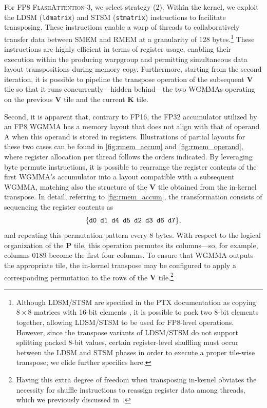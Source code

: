 \begin{algorithm}[H]
\begin{algorithmic}[1]
For FP8 \textsc{FlashAttention-3}, we select strategy (2). Within the kernel, we exploit the LDSM (\verb|ldmatrix|) and STSM (\verb|stmatrix|) instructions to facilitate transposing. These instructions enable a warp of threads to collaboratively transfer data between SMEM and RMEM at a granularity of 128 bytes.\footnote{Although LDSM/STSM are specified in the PTX documentation as copying $8 \times 8$ matrices with 16-bit elements \cite[\S 9.7.13.4.15-16]{ptx}, it is possible to pack two 8-bit elements together, allowing LDSM/STSM to be used for FP8-level operations. However, since the transpose variants of LDSM/STSM do not support splitting packed 8-bit values, certain register-level shuffling must occur between the LDSM and STSM phases in order to execute a proper tile-wise transpose; we elide further specifics here.} These instructions are highly efficient in terms of register usage, enabling their execution within the producing warpgroup and permitting simultaneous data layout transpositions during memory copy. Furthermore, starting from the second iteration, it is possible to pipeline the transpose operation of the subsequent $\mathbf{V}$ tile so that it runs concurrently—hidden behind—the two WGMMAs operating on the previous $\mathbf{V}$ tile and the current $\mathbf{K}$ tile.

Second, it is apparent that, contrary to FP16, the FP32 accumulator utilized by an FP8 WGMMA has a memory layout that does not align with that of operand A when this operand is stored in registers. Illustrations of partial layouts for these two cases can be found in \cref{fig:rmem_accum} and \cref{fig:rmem_operand}, where register allocation per thread follows the orders indicated. By leveraging byte permute instructions, it is possible to rearrange the register contents of the first WGMMA's accumulator into a layout compatible with a subsequent WGMMA, matching also the structure of the $\mathbf{V}$ tile obtained from the in-kernel transpose. In detail, referring to \cref{fig:rmem_accum}, the transformation consists of sequencing the register contents as
$$\{ \verb|d0 d1 d4 d5 d2 d3 d6 d7| \},$$
and repeating this permutation pattern every 8 bytes. With respect to the logical organization of the $\mathbf{P}$ tile, this operation permutes its columns—so, for example, columns $0189$ become the first four columns. To ensure that WGMMA outputs the appropriate tile, the in-kernel transpose may be configured to apply a corresponding permutation to the rows of the $\mathbf{V}$ tile.\footnote{Having this extra degree of freedom when transposing in-kernel obviates the necessity for shuffle instructions to reassign register data among threads, which we previously discussed in~\citep{colfax_fp8_flashattention_2024}.}


\end{algorithmic}
\end{algorithm}
